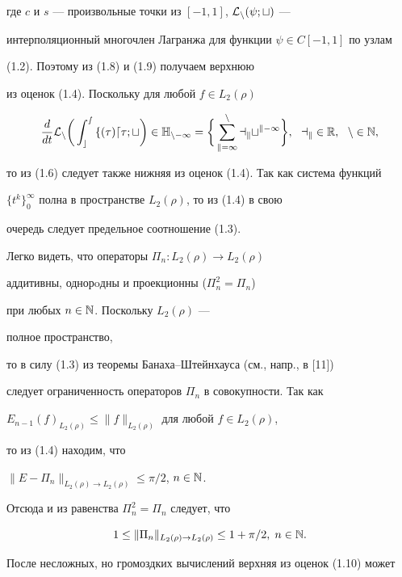 где $c$ и $s$ --- произвольные точки из $[-1,1]$, $\cal L_n(\psi;t)$ ---


интерполяционный многочлен Лагранжа для функции $\psi \in C[-1,1]$ по узлам


(1.2). Поэтому из (1.8) и (1.9) получаем верхнюю 


из оценок (1.4). Поскольку для любой $f \in L_2(\rho)$


$$


\frac{d}{dt}\cal L_n\bigg(


\int_c^s f(\tau)d\tau;t


\bigg) \in \Bbb H_{n-1}=\bigg\{


\sum_{k=1}^{n}a_kt^{k-1}


\bigg\},\ \ a_k\in \Bbb R,\ \ n\in \Bbb N,


$$


то из (1.6) следует также нижняя из оценок (1.4). Так как система функций


$\{t^k\}_0^\infty$ полна в пространстве $L_2(\rho)$, то из (1.4) в свою


очередь следует предельное соотношение (1.3).





Легко видеть, что операторы $\Pi_n:L_2(\rho)\to L_2(\rho)$ 


аддитивны, однорoдны и проекционны ($\Pi_n^2=\Pi_n$) 


при любых $n\in \Bbb N$. Поскольку $L_2(\rho)$ ---


полное пространство,


то в силу (1.3) из теоремы Банаха--Штейнхауса (см., напр., в [11])


следует ограниченность операторов $\Pi_n$ в совокупности. Так как


$E_{n-1}(f)_{L_2(\rho)}\le \|f\|_{L_2(\rho)}$ для любой $f\in L_2(\rho)$,


то из (1.4) находим, что


$\|E-\Pi_n\|_{L_2(\rho)\to L_2(\rho)}\le \pi/2$, $n \in \Bbb N$.


Отсюда и из равенства $\Pi_n^2=\Pi_n$ следует, что


\begin{equation}


1\le \|\Pi_n\|_{L_2(\rho)\to L_2(\rho)} \le 1+\pi/2,\; n \in \Bbb N.


\end{equation}


После несложных, но громоздких вычислений верхняя из оценок (1.10) может


